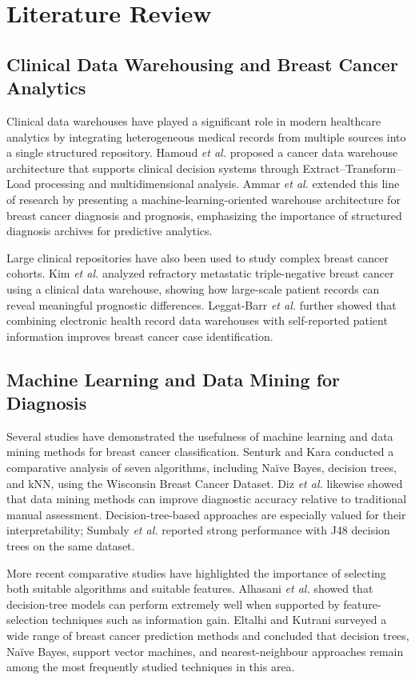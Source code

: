 \documentclass[conference]{IEEEtran}
\begin{document}
\section{Literature Review}
\subsection{Clinical Data Warehousing and Breast Cancer Analytics}
Clinical data warehouses have played a significant role in modern healthcare analytics by integrating heterogeneous medical records from multiple sources into a single structured repository. Hamoud \textit{et al.} proposed a cancer data warehouse architecture that supports clinical decision systems through Extract--Transform--Load processing and multidimensional analysis. Ammar \textit{et al.} extended this line of research by presenting a machine-learning-oriented warehouse architecture for breast cancer diagnosis and prognosis, emphasizing the importance of structured diagnosis archives for predictive analytics.

Large clinical repositories have also been used to study complex breast cancer cohorts. Kim \textit{et al.} analyzed refractory metastatic triple-negative breast cancer using a clinical data warehouse, showing how large-scale patient records can reveal meaningful prognostic differences. Leggat-Barr \textit{et al.} further showed that combining electronic health record data warehouses with self-reported patient information improves breast cancer case identification.

\subsection{Machine Learning and Data Mining for Diagnosis}
Several studies have demonstrated the usefulness of machine learning and data mining methods for breast cancer classification. Senturk and Kara conducted a comparative analysis of seven algorithms, including Na\"ive Bayes, decision trees, and kNN, using the Wisconsin Breast Cancer Dataset. Diz \textit{et al.} likewise showed that data mining methods can improve diagnostic accuracy relative to traditional manual assessment. Decision-tree-based approaches are especially valued for their interpretability; Sumbaly \textit{et al.} reported strong performance with J48 decision trees on the same dataset.

More recent comparative studies have highlighted the importance of selecting both suitable algorithms and suitable features. Alhasani \textit{et al.} showed that decision-tree models can perform extremely well when supported by feature-selection techniques such as information gain. Eltalhi and Kutrani surveyed a wide range of breast cancer prediction methods and concluded that decision trees, Na\"ive Bayes, support vector machines, and nearest-neighbour approaches remain among the most frequently studied techniques in this area.
\end{document}
